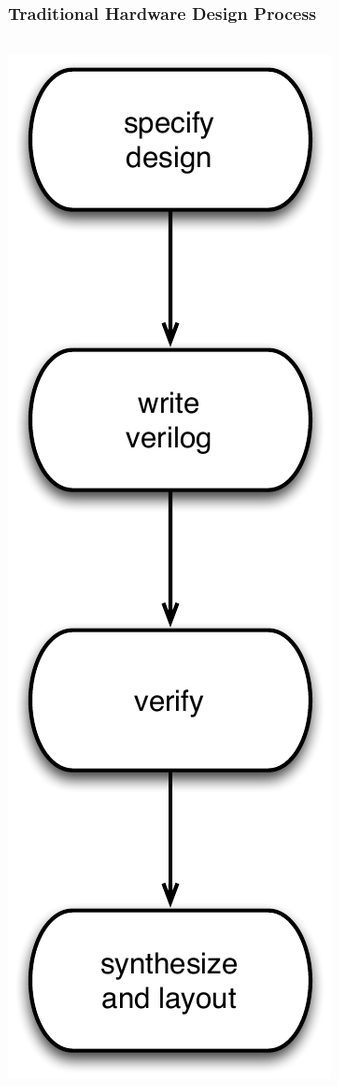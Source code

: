 \documentclass[xcolor=pdflatex,dvipsnames,table]{beamer}
\begin{document}
\begin{frame}

\frametitle{Traditional Hardware Design Process}

\begin{columns}


\begin{center}
\includegraphics[height=0.9\textheight]{figs/traditional-static-design-process.pdf}
\end{center}


\end{columns}
\end{frame}
\end{document}
